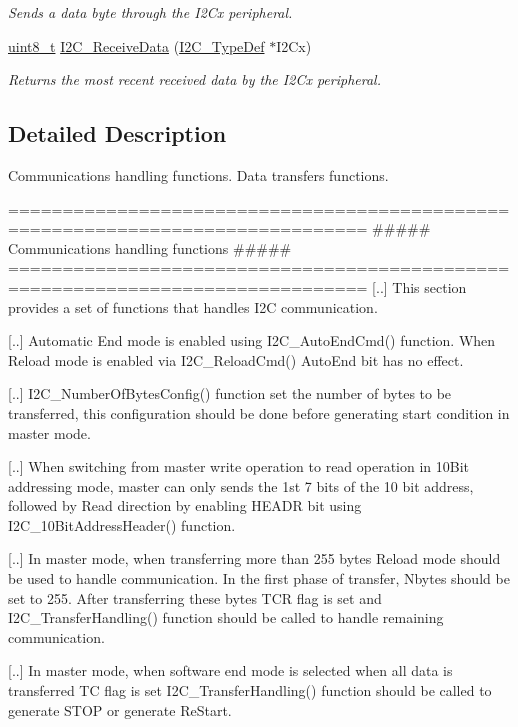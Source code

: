 \begin{DoxyCompactItemize}
\begin{DoxyCompactList}\small\item\em Sends a data byte through the I2\-Cx peripheral. \end{DoxyCompactList}\item 
\hyperlink{stdint_8h_aba7bc1797add20fe3efdf37ced1182c5}{uint8\-\_\-t} \hyperlink{group___i2_c___group2_gaeaaa4b6f77f50eb57465148c55d27fb2}{I2\-C\-\_\-\-Receive\-Data} (\hyperlink{struct_i2_c___type_def}{I2\-C\-\_\-\-Type\-Def} $\ast$I2\-Cx)
\begin{DoxyCompactList}\small\item\em Returns the most recent received data by the I2\-Cx peripheral. \end{DoxyCompactList}\end{DoxyCompactItemize}


\subsection{Detailed Description}
Communications handling functions. Data transfers functions.

\begin{DoxyVerb} ===============================================================================
                  ##### Communications handling functions #####
 ===============================================================================  
    [..] This section provides a set of functions that handles I2C communication.
    
    [..] Automatic End mode is enabled using I2C_AutoEndCmd() function. When Reload
         mode is enabled via I2C_ReloadCmd() AutoEnd bit has no effect.
         
    [..] I2C_NumberOfBytesConfig() function set the number of bytes to be transferred,
         this configuration should be done before generating start condition in master 
         mode.
         
    [..] When switching from master write operation to read operation in 10Bit addressing
         mode, master can only sends the 1st 7 bits of the 10 bit address, followed by 
         Read direction by enabling HEADR bit using I2C_10BitAddressHeader() function.        
         
    [..] In master mode, when transferring more than 255 bytes Reload mode should be used
         to handle communication. In the first phase of transfer, Nbytes should be set to 
         255. After transferring these bytes TCR flag is set and I2C_TransferHandling()
         function should be called to handle remaining communication.
         
    [..] In master mode, when software end mode is selected when all data is transferred
         TC flag is set I2C_TransferHandling() function should be called to generate STOP
         or generate ReStart.                      \end{DoxyVerb}


